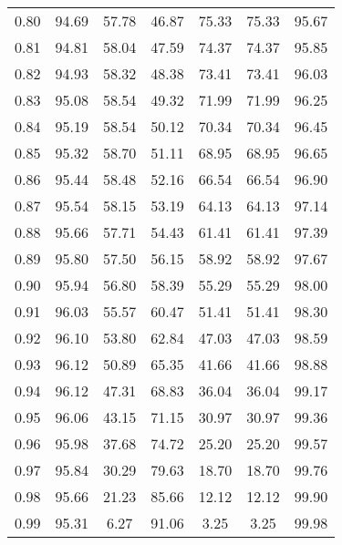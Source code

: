 \begin{tabular}{|c|c|c|c|c|c|c|}
      0.80 &     94.69 &     57.78 &      46.87 &   75.33 &      75.33 &         95.67 \\
      0.81 &     94.81 &     58.04 &      47.59 &   74.37 &      74.37 &         95.85 \\
      0.82 &     94.93 &     58.32 &      48.38 &   73.41 &      73.41 &         96.03 \\
      0.83 &     95.08 &     58.54 &      49.32 &   71.99 &      71.99 &         96.25 \\
      0.84 &     95.19 &     58.54 &      50.12 &   70.34 &      70.34 &         96.45 \\
      0.85 &     95.32 &     58.70 &      51.11 &   68.95 &      68.95 &         96.65 \\
      0.86 &     95.44 &     58.48 &      52.16 &   66.54 &      66.54 &         96.90 \\
      0.87 &     95.54 &     58.15 &      53.19 &   64.13 &      64.13 &         97.14 \\
      0.88 &     95.66 &     57.71 &      54.43 &   61.41 &      61.41 &         97.39 \\
      0.89 &     95.80 &     57.50 &      56.15 &   58.92 &      58.92 &         97.67 \\
      0.90 &     95.94 &     56.80 &      58.39 &   55.29 &      55.29 &         98.00 \\
      0.91 &     96.03 &     55.57 &      60.47 &   51.41 &      51.41 &         98.30 \\
      0.92 &     96.10 &     53.80 &      62.84 &   47.03 &      47.03 &         98.59 \\
      0.93 &     96.12 &     50.89 &      65.35 &   41.66 &      41.66 &         98.88 \\
      0.94 &     96.12 &     47.31 &      68.83 &   36.04 &      36.04 &         99.17 \\
      0.95 &     96.06 &     43.15 &      71.15 &   30.97 &      30.97 &         99.36 \\
      0.96 &     95.98 &     37.68 &      74.72 &   25.20 &      25.20 &         99.57 \\
      0.97 &     95.84 &     30.29 &      79.63 &   18.70 &      18.70 &         99.76 \\
      0.98 &     95.66 &     21.23 &      85.66 &   12.12 &      12.12 &         99.90 \\
      0.99 &     95.31 &      6.27 &      91.06 &    3.25 &       3.25 &         99.98 \\
\bottomrule
\end{tabular}
